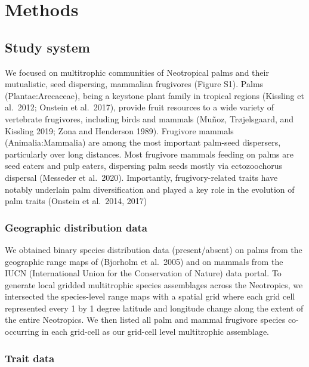 \documentclass[
]{agujournal2019}
\begin{document}
\section{Methods}\label{methods}

\subsection{Study system}\label{study-system}

We focused on multitrophic communities of Neotropical palms and their
mutualistic, seed dispersing, mammalian frugivores (Figure S1). Palms
(Plantae:Arecaceae), being a keystone plant family in tropical regions
(Kissling et al.~2012; Onstein et al.~2017), provide fruit resources to
a wide variety of vertebrate frugivores, including birds and mammals
(Muñoz, Trøjelsgaard, and Kissling 2019; Zona and Henderson 1989).
Frugivore mammals (Animalia:Mammalia) are among the most important
palm-seed dispersers, particularly over long distances. Most frugivore
mammals feeding on palms are seed eaters and pulp eaters, dispersing
palm seeds mostly via ectozoochorus dispersal (Messeder et al.~2020).
Importantly, frugivory-related traits have notably underlain palm
diversification and played a key role in the evolution of palm traits
(Onstein et al.~2014, 2017)

\subsubsection{Geographic distribution
data}\label{geographic-distribution-data}

We obtained binary species distribution data (present/absent) on palms
from the geographic range maps of (Bjorholm et al.~2005) and on mammals
from the IUCN (International Union for the Conservation of Nature) data
portal. To generate local gridded multitrophic species assemblages
across the Neotropics, we intersected the species-level range maps with
a spatial grid where each grid cell represented every 1 by 1 degree
latitude and longitude change along the extent of the entire Neotropics.
We then listed all palm and mammal frugivore species co-occurring in
each grid-cell as our grid-cell level multitrophic assemblage.

\subsubsection{Trait data}\label{trait-data}
\end{document}
